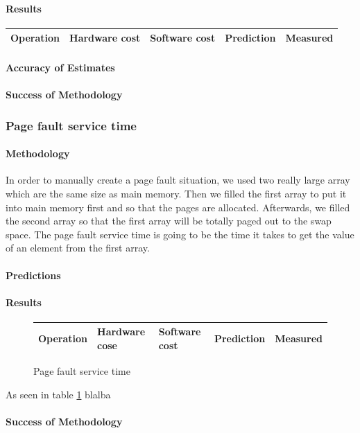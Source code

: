 \paragraph{Results}

\begin{center}
\begin{tabular}{| l | l | l | l | l |}
\hline
Operation & Hardware cost & Software cost & Prediction & Measured \\
\hline
\end{tabular}
\end{center}
\paragraph{Accuracy of Estimates}
\paragraph{Success of Methodology}




\subsubsection{Page fault service time}
\paragraph{Methodology}
In order to manually create a page fault situation, we used two really large array which are the same size as main memory.
Then we filled the first array to put it into main memory first and so that the pages are allocated.
Afterwards, we filled the second array so that the first array will be totally paged out to the swap space.
The page fault service time is going to be the time it takes to get the value of an element from the first array.

\paragraph{Predictions}


\paragraph{Results}
\begin{figure}[h]
\begin{center}
\begin{tabular}{| l | l | l | l | l |}
\hline
Operation & Hardware cose & Software cost & Prediction & Measured \\
\hline
\end{tabular}
\end{center}
\caption{Page fault service time}
\label{fig:page-fault}
\end{figure}

As seen in table \ref{fig:page-fault} blalba
\paragraph{Success of Methodology}


